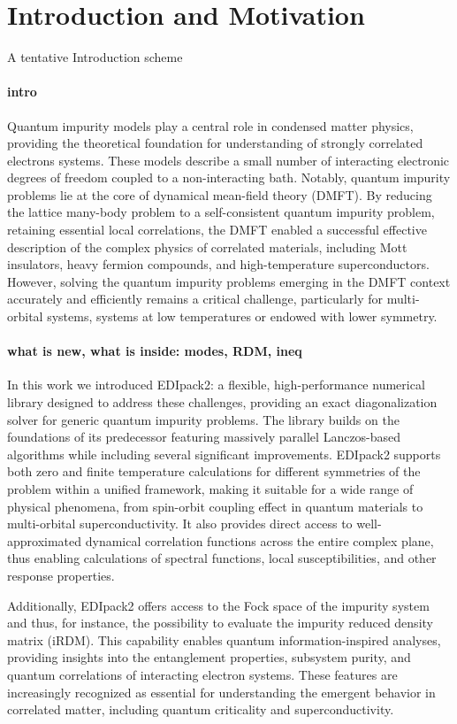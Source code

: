 \documentclass[edipack2.tex]{subfiles}
\begin{document}
\section{Introduction and Motivation}\label{SecIntro}
{\color{red} A tentative Introduction scheme}


\paragraph{intro} Quantum impurity models play a central role in condensed matter
physics, providing the theoretical foundation for understanding
of strongly correlated electrons systems.
These models describe a small
number of interacting electronic degrees of freedom coupled to 
a non-interacting bath.
Notably, quantum impurity problems lie at the core of dynamical mean-field theory
(DMFT). By  reducing the lattice many-body problem to a
self-consistent quantum impurity problem,  retaining essential local
correlations, the DMFT enabled a  successful effective description of the
complex physics of correlated materials, including Mott insulators,
heavy fermion compounds, and high-temperature superconductors.  
However, solving the quantum impurity problems emerging in the DMFT context accurately and efficiently remains a
critical challenge, particularly for multi-orbital systems, systems
at low temperatures or endowed with lower symmetry. 


\paragraph{what is new, what is inside: modes, RDM, ineq}
  In this work we introduced EDIpack2: a flexible, high-performance numerical library designed to
address these challenges, providing an exact diagonalization solver
for generic quantum impurity problems. 
The library builds on the foundations of
its predecessor featuring massively parallel Lanczos-based algorithms while including several significant
improvements. EDIpack2 supports both zero and finite temperature
calculations for different symmetries of the problem  
within a unified framework, making it suitable for a wide
range of physical phenomena, from spin-orbit coupling effect in
quantum materials to multi-orbital superconductivity. It also provides direct
access to well-approximated dynamical correlation functions across the
entire complex plane, thus enabling calculations of spectral functions, local susceptibilities, and
other response properties.


Additionally, EDIpack2 offers access to the Fock space of
the impurity system and thus, for instance, the possibility to
evaluate the impurity reduced density matrix
(iRDM). This capability enables quantum information-inspired analyses,
providing insights into the entanglement properties, subsystem purity,
and quantum correlations of interacting electron systems. These
features are increasingly recognized as essential for understanding
the emergent behavior in correlated matter, including quantum
criticality and superconductivity.
\end{document}
